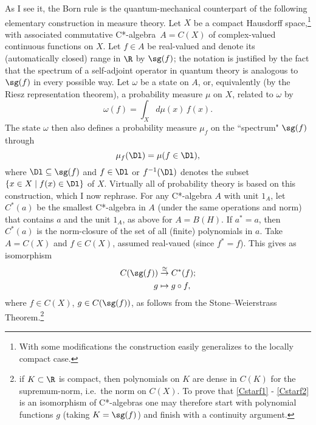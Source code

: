 \documentclass[12pt]{article}
\numberwithin{equation}{section}
\newcommand{\er}{\eqref}
\newcommand{\beq}{\begin{equation}}
\newcommand{\eeq}{\end{equation}}
\newcommand{\raw}{\rightarrow}
\newcommand{\ca}{C*-algebra} \newcommand{\jba}{JB-algebra}
\newcommand{\om}{\omega} \newcommand{\Om}{\Omega}
\newcommand{\inv}{^{-1}}
\begin{document}
As I see it, the Born rule is the quantum-mechanical counterpart of the following elementary construction in measure theory. 
Let $X$ be a compact Hausdorff space,\footnote{With some modifications the construction easily generalizes to the locally compact case.} with associated commutative \ca\ $A=C(X)$ of complex-valued continuous functions on $X$. 
Let $f\in A$ be real-valued and denote its (automatically closed) range in $\R$ by $\sg(f)$; the notation is justified by the fact that the spectrum of a self-adjoint operator in quantum theory is analogous to $\sg(f)$ in every possible way. Let $\om$ be a state on $A$, or, equivalently (by the Riesz representation theorem), a probability measure $\mu$ on $X$, related to $\om$ by 
\beq
\om(f)=\int_X d\mu(x)\, f(x).
\eeq 
The state $\om$ then also defines a probability measure $\mu_f$ on the ``spectrum" $\sg(f)$ through
  \begin{equation}
\mu_f(\Dl)=\mu(f\in \Dl), \label{muf}
\end{equation}
where  $\Dl\subseteq \sg(f)$ and $f\in\Dl$ or $f\inv(\Dl)$ denotes the subset $\{x\in X\mid f(x)\in\Dl\}$ of $X$. Virtually all of probability theory is based on this construction, which I now rephrase. For any C*-algebra $A$ with unit $1_A$, let $C^*(a)$ be the smallest C*-algebra in $A$ (under the same operations and norm) that contains $a$ and the unit $1_A$, as above for $A=B(H)$.
 If $a^*=a$, then $C^*(a)$ is the norm-closure of the set of all (finite) polynomials in $a$.
Take $A=C(X)$  and $f\in C(X)$, assumed real-vaued (since $f^*=f$). This gives as isomorphism
\begin{align}
C(\sg(f))&\stackrel{\cong}{\raw} C^*(f); \label{Cstarf1}\\
g&\mapsto g\circ f,\label{Cstarf2}
\end{align} 
where $f\in C(X)$, $g\in C(\sg(f))$, as follows from  the Stone--Weierstrass Theorem.\footnote{
if $K\subset\R$ is compact, then polynomials on $K$ are dense in $C(K)$ for the supremum-norm, i.e.\ the norm on $C(X)$. To prove  that \er{Cstarf1} - \er{Cstarf2} is an isomorphism of C*-algebras one may therefore start with polynomial functions $g$ (taking $K=\sg(f)$) and finish with a continuity argument.}
\end{document}
